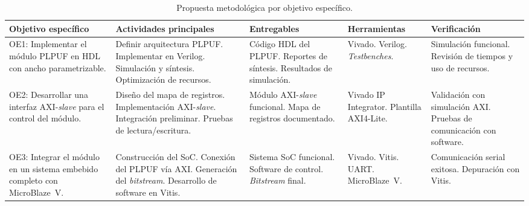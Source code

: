 \begin{table}[htbp]
\centering
\caption{Propuesta metodológica por objetivo específico.}
\label{tab:metodologia}
\small
\renewcommand{\arraystretch}{1.3}
\begin{tabular}{|p{3.0cm}|p{3.0cm}|p{2.5cm}|p{2.5cm}|p{2.5cm}|}
\hline
\textbf{Objetivo específico} &
\textbf{Actividades principales} &
\textbf{Entregables} &
\textbf{Herramientas} &
\textbf{Verificación} \\
\hline

OE1: Implementar el módulo PLPUF en HDL con ancho parametrizable. &
Definir arquitectura PLPUF.\newline
Implementar en Verilog.\newline
Simulación y síntesis.\newline
Optimización de recursos. &
Código HDL del PLPUF.\newline
Reportes de síntesis.\newline
Resultados de simulación. &
Vivado.\newline
Verilog.\newline
\textit{Testbenches}. &
Simulación funcional.\newline
Revisión de tiempos y uso de recursos. \\
\hline

OE2: Desarrollar una interfaz AXI-\textit{slave} para el control del módulo. &
Diseño del mapa de registros.\newline
Implementación AXI-\textit{slave}.\newline
Integración preliminar.\newline
Pruebas de lectura/escritura. &
Módulo AXI-\textit{slave} funcional.\newline
Mapa de registros documentado. &
Vivado IP Integrator.\newline
Plantilla AXI4-Lite. &
Validación con simulación AXI.\newline
Pruebas de comunicación con software. \\
\hline

OE3: Integrar el módulo en un sistema embebido completo con MicroBlaze~V. &
Construcción del SoC.\newline
Conexión del PLPUF vía AXI.\newline
Generación del \textit{bitstream}.\newline
Desarrollo de software en Vitis. &
Sistema SoC funcional.\newline
Software de control.\newline
\textit{Bitstream} final. &
Vivado.\newline
Vitis.\newline
UART.\newline
MicroBlaze~V. &
Comunicación serial exitosa.\newline
Depuración con Vitis. \\
\hline


\end{tabular}
\end{table}
